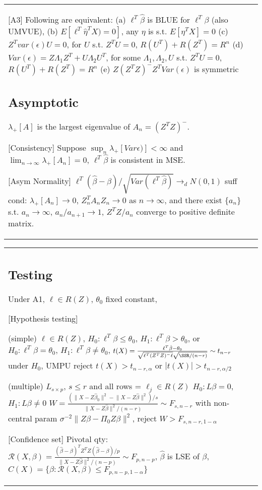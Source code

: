 \begin{tabulary}{\textwidth}{l || L}
	[A3] Following are equivalent:
	(a) $\ell^T\hat\beta$ is BLUE for $\ell^T\beta$ (also UMVUE),
	(b) $E[\ell^T\hat\eta^TX)=0]$, any $\eta$ is s.t. $E[\eta^TX]=0$
	(c) $Z^T var(\epsilon) U = 0$, for $U$ s.t. $Z^TU = 0$, $R(U^T)+R(Z^T)=R^n$
	(d) $Var(\epsilon) = Z\Lambda_1 Z^T + U \Lambda_2 U^T$,
	for some $\Lambda_1, \Lambda_2, U$ s.t. $Z^TU = 0$, $R(U^T)+R(Z^T)=R^n$
	(e) $Z(Z^TZ)^-Z^T Var(\epsilon)$ is symmetric

	\subsection{Asymptotic}

	$\lambda_+[A]$ is the largest eigenvalue of $A_n = (Z^TZ)^-$.

		[Consistency]
	Suppose $\sup_n \lambda_+ [Var\epsilon)] < \infty$ and
	$\lim_{n\rightarrow\infty} \lambda_+ [A_n] = 0$,
	$\ell^T\hat\beta$ is consistent in MSE.

		[Asym Normality]
	$\ell^T(\hat\beta-\beta)/\sqrt{Var(\ell^T\hat\beta)}\rightarrow_d N(0, 1)$
	suff cond: $\lambda_+[A_n]\rightarrow 0$, $Z_n^T A_n Z_n \rightarrow 0$ as
	$n\rightarrow\infty$, and
	there exist $\{a_n\}$ s.t. $a_n\rightarrow \infty$, $a_n/a_{n+1}\rightarrow
		1$, $Z^TZ/a_n$ converge to positive definite matrix.

\end{tabulary}

\begin{tabulary}{\textwidth}{l || L}



	\subsection{Testing}

	Under A1, $\ell \in R(Z)$, $\theta_0$ fixed constant,

	[Hypothesis testing]

	(simple)
	$\ell \in R(Z)$,
	$H_0: \ell^T\beta \leq \theta_0$, $H_1: \ell^T\beta > \theta_0$,
	or $H_0: \ell^T\beta = \theta_0$, $H_1: \ell^T\beta \neq \theta_0$,
	$
		t(X) = \frac{\ell^T\hat\beta - \theta_0}{
			\sqrt{ \ell^T(Z^TZ)^-\ell }
			\sqrt{ \SSR/(n-r) }
		} \sim t_{n-r}
	$ under $H_0$,
	UMPU reject $t(X) > t_{n-r, \alpha}$
	or $|t(X)| > t_{n-r, \alpha/2}$

	(multiple)
	$L_{s\times p}$, $s \leq r$ and all rows = $\ell_j \in R(Z)$
	$H_0: L\beta = 0$, $H_1: L\beta \neq 0$
	$
		W = \frac{(\lVert X - Z\hat\beta_0 \rVert^2 - \lVert X - Z\hat\beta
			\rVert^2)/s}{\lVert X - Z\hat\beta \rVert^2/(n-r)} \sim F_{s, n-r}
			{}
	$
	with non-central param
	$\sigma^{-2}\lVert Z\beta - \Pi_0Z\beta\rVert^2$,
	reject $W > F_{s, n-r, 1-\alpha}$

	[Confidence set]
	Pivotal qty: $
		\mathcal{R}(X, \beta) = \frac{(\hat\beta -
			\beta)^TZ^TZ(\hat\beta-\beta)/p}{
			\lVert X - Z\hat\beta \rVert^2/(n-p)
		} \sim F_{p, n-p}
	$, $\hat\beta$ is LSE of $\beta$,
	$C(X) = \{\beta: \mathcal{R}(X, \beta) \leq F_{p, n-p, 1-\alpha}\}$
\end{tabulary}
